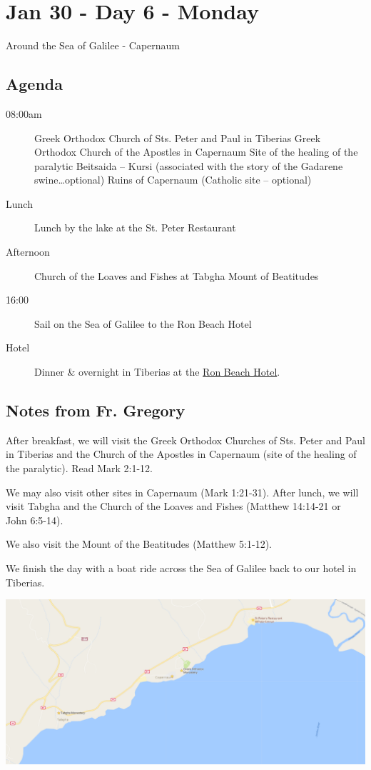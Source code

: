 \documentclass[letterpaper]{report}
\begin{document}
\clearpage
\section{Jan 30 - Day 6 - Monday}
Around the Sea of Galilee - Capernaum

\subsection{Agenda}
\begin{description}
	\item[08:00am]  Greek Orthodox Church of Sts. Peter and Paul in Tiberias 
	  \subitem Greek Orthodox Church of the Apostles in Capernaum
	  \subitem Site of the healing of the paralytic
	  \subitem Beitsaida – Kursi
	      (associated with the story of the Gadarene swine…optional)
	  \subitem Ruins of Capernaum (Catholic site – optional) 
	\item[Lunch] Lunch by the lake at the St. Peter Restaurant
	\item[Afternoon] Church of the Loaves and Fishes at Tabgha Mount of 
	     Beatitudes
	\item[16:00] Sail on the Sea of Galilee to the Ron Beach Hotel
	\item[Hotel] Dinner \& overnight in Tiberias at the
	  \href{http://www.ronbeachhotel.com/}{Ron Beach Hotel}.
\end{description}

\subsection{Notes from Fr. Gregory}
After breakfast, we will visit the Greek Orthodox Churches of
Sts. Peter and Paul in Tiberias and the Church of the Apostles in Capernaum
(site of the healing of the paralytic).
Read Mark 2:1-12.

We may also visit other sites in Capernaum (Mark 1:21-31).
After lunch, we will visit Tabgha and the Church of the Loaves and Fishes
(Matthew 14:14-21 or John 6:5-14).

We also visit the Mount of the Beatitudes (Matthew 5:1-12).

We finish the day with a boat ride across the Sea of Galilee back to our hotel 
in Tiberias.

\includegraphics[width=\textwidth]{Capernaum}
\end{document}
